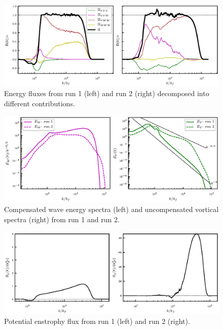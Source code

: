  \begin{figure}[h]
\centerline{\includegraphics[angle=0]{./fig5.eps}}
 \caption{Energy fluxes from run 1 (left) and run 2 (right) decomposed into different contributions. }
 \label{Flux2}
 \end{figure}
 
  \begin{figure}[h]
\centerline{\includegraphics[angle=0]{./fig6.eps}}
 \caption{Compensated wave energy spectra (left) and uncompensated vortical spectra (right) from run 1 and run 2. }
 \label{C2}
 \end{figure}



\begin{figure}[h]
\centerline{\includegraphics[angle=0]{./fig7.eps}}
 \caption{Potential enstrophy flux from run 1 (left) and run 2 (right). }
 \label{EF1}
  \end{figure}
 

